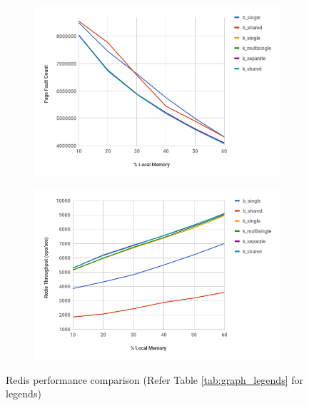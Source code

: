 \begin{figure}[t]
	\centering
	
	\begin{subfigure}[t]{\textwidth}
		\includegraphics[width=\textwidth]{evaluation/compare_pf_redis.png}
		\caption{}
		\label{fig:compare_pf_redis}
	\end{subfigure}
	\begin{subfigure}[t]{\textwidth}
		\includegraphics[width=\textwidth]{evaluation/compare_tp_redis.png}
		\caption{}
		\label{fig:compare_tp_redis}
	\end{subfigure}
	\caption{Redis performance comparison (Refer Table \ref{tab:graph_legends} for legends)}
	\label{fig:compare_redis}
\end{figure}

